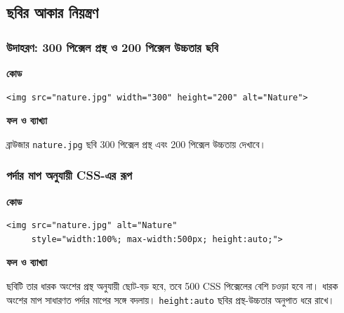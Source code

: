 \subsection{ছবির আকার নিয়ন্ত্রণ}

\subsubsection{উদাহরণ: 300 পিক্সেল প্রস্থ ও 200 পিক্সেল উচ্চতার ছবি}

\par\noindent
\begin{minipage}[t]{.54\linewidth}\vspace{0pt}\small
\textbf{\color{chFourTeal}কোড}\par
\begin{verbatim}
<img src="nature.jpg" width="300" height="200" alt="Nature">
\end{verbatim}

\par\smallskip
\end{minipage}\hfill
\begin{minipage}[t]{.42\linewidth}\vspace{0pt}\small
\textbf{\color{chFourTeal}ফল ও ব্যাখ্যা}\par
ব্রাউজার \texttt{nature.jpg} ছবি 300 পিক্সেল প্রস্থ এবং 200 পিক্সেল উচ্চতায় দেখাবে।
\par\smallskip
\end{minipage}\par


\subsubsection{পর্দার মাপ অনুযায়ী CSS-এর রূপ}

\par\noindent
\begin{minipage}[t]{.54\linewidth}\vspace{0pt}\small
\textbf{\color{chFourTeal}কোড}\par
\begin{verbatim}
<img src="nature.jpg" alt="Nature"
     style="width:100%; max-width:500px; height:auto;">
\end{verbatim}

\par\smallskip
\end{minipage}\hfill
\begin{minipage}[t]{.42\linewidth}\vspace{0pt}\small
\textbf{\color{chFourTeal}ফল ও ব্যাখ্যা}\par
ছবিটি তার ধারক অংশের প্রস্থ অনুযায়ী ছোট-বড় হবে, তবে 500 CSS পিক্সেলের বেশি চওড়া হবে না। ধারক অংশের মাপ সাধারণত পর্দার মাপের সঙ্গে বদলায়। \texttt{height:auto} ছবির প্রস্থ-উচ্চতার অনুপাত ধরে রাখে।
\par\smallskip
\end{minipage}\par


